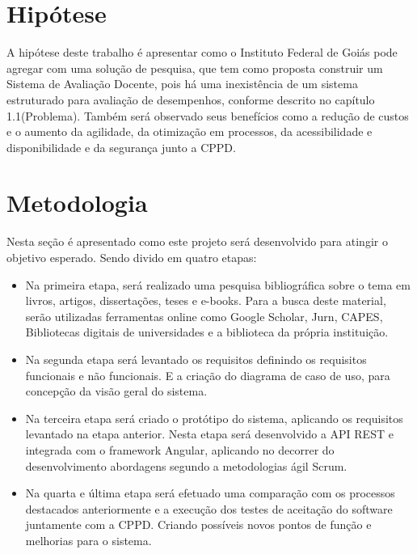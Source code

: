 \newpage
\chapter{Hipótese}
    A hipótese deste trabalho é apresentar como o Instituto Federal de Goiás pode agregar com uma solução de pesquisa, que tem como proposta construir um Sistema de Avaliação Docente, pois há uma inexistência de um sistema estruturado para avaliação de desempenhos, conforme descrito no capítulo 1.1(Problema). Também será observado seus benefícios como a redução de custos e o aumento da agilidade, da otimização em processos, da acessibilidade e disponibilidade e da segurança junto a CPPD.


\newpage
\chapter{Metodologia}

    Nesta seção é apresentado como este projeto será desenvolvido para atingir o objetivo esperado. Sendo divido em quatro etapas:
    
    \begin{itemize}
        \item Na primeira etapa, será realizado uma pesquisa bibliográfica sobre o tema em livros, artigos, dissertações, teses e e-books. Para a busca deste material, serão utilizadas ferramentas online como Google Scholar, Jurn, CAPES, Bibliotecas digitais de universidades e a biblioteca da própria instituição.
    
        \item Na segunda etapa será levantado os requisitos definindo os requisitos funcionais e não funcionais. E a criação do diagrama de caso de uso, para concepção da visão geral do sistema. 
    
    	\item Na terceira etapa será criado o protótipo do sistema, aplicando os requisitos levantado na etapa anterior. Nesta etapa será desenvolvido a API REST e integrada com o framework Angular, aplicando no decorrer do desenvolvimento abordagens segundo a metodologias ágil Scrum.
    	
    	\item Na quarta e última etapa será efetuado uma comparação com os processos destacados anteriormente e a execução dos testes de aceitação do software juntamente com a CPPD. Criando possíveis novos pontos de função e melhorias para o sistema.

\end{itemize}



